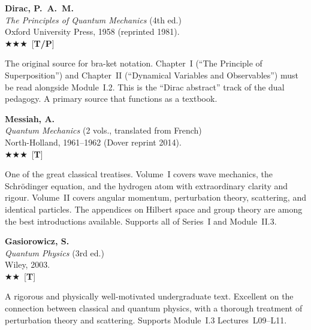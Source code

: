 \documentclass[11pt,a4paper]{article}
\newcommand{\essential}{$\bigstar\bigstar\bigstar$}
\newcommand{\recommended}{$\bigstar\bigstar$}
\newenvironment{bibentry}[1]{\begin{tcolorbox}[entrybox=#1,top=4pt,bottom=4pt]}{\end{tcolorbox}\smallskip}
\begin{document}
\begin{bibentry}{t3light}
\textbf{Dirac, P.~A.~M.}\\
\textit{The Principles of Quantum Mechanics} (4th ed.)\\
Oxford University Press, 1958 (reprinted 1981).\\[3pt]
\essential\ [\textbf{T/P}]\\[3pt]
\begin{tcolorbox}[annotbox]
The original source for bra-ket notation. Chapter~I (``The Principle of
Superposition'') and Chapter~II (``Dynamical Variables and Observables'') must be
read alongside Module~I.2. This is the ``Dirac abstract'' track of the dual pedagogy.
A primary source that functions as a textbook.
\end{tcolorbox}
\end{bibentry}

\begin{bibentry}{t3light}
\textbf{Messiah, A.}\\
\textit{Quantum Mechanics} (2 vols., translated from French)\\
North-Holland, 1961--1962 (Dover reprint 2014).\\[3pt]
\essential\ [\textbf{T}]\\[3pt]
\begin{tcolorbox}[annotbox]
One of the great classical treatises. Volume~I covers wave mechanics, the Schr\"odinger
equation, and the hydrogen atom with extraordinary clarity and rigour. Volume~II
covers angular momentum, perturbation theory, scattering, and identical particles.
The appendices on Hilbert space and group theory are among the best introductions
available. Supports all of Series~I and Module~II.3.
\end{tcolorbox}
\end{bibentry}

\begin{bibentry}{t3light}
\textbf{Gasiorowicz, S.}\\
\textit{Quantum Physics} (3rd ed.)\\
Wiley, 2003.\\[3pt]
\recommended\ [\textbf{T}]\\[3pt]
\begin{tcolorbox}[annotbox]
A rigorous and physically well-motivated undergraduate text. Excellent on the
connection between classical and quantum physics, with a thorough treatment of
perturbation theory and scattering. Supports Module~I.3 Lectures~L09--L11.
\end{tcolorbox}
\end{bibentry}
\end{document}

